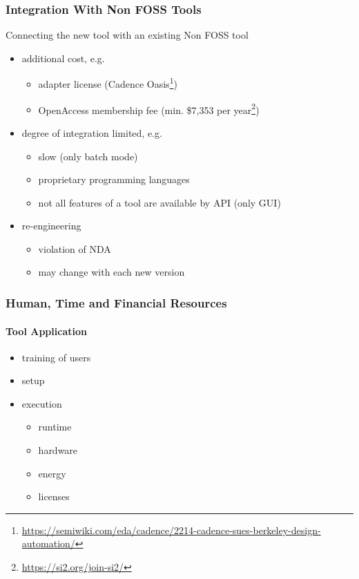 \documentclass[10pt, aspectratio=169]{beamer}
\begin{document}
\begin{frame}
\frametitle{Integration With Non FOSS Tools}

Connecting the new tool with an existing Non FOSS tool

\vspace{5mm}

\begin{itemize}
  \item additional cost, e.g.
    \begin{itemize}
      \item adapter license (Cadence Oasis\footnote{\url{https://semiwiki.com/eda/cadence/2214-cadence-sues-berkeley-design-automation/}})
      \item OpenAccess membership fee (min. \$7,353 per year\footnote{\url{https://si2.org/join-si2/}})
    \end{itemize}  
  \item degree of integration limited, e.g.
    \begin{itemize}
      \item slow (only batch mode)
      \item proprietary programming languages
      \item not all features of a tool are available by API (only GUI)
    \end{itemize}
  \item re-engineering
    \begin{itemize}
      \item violation of NDA
      \item may change with each new version
    \end{itemize}
\end{itemize}
\end{frame}

\begin{frame}
\frametitle{Human, Time and Financial Resources}
\framesubtitle{Tool Application}

\begin{itemize}
  \item training of users
  \item setup 
  \item execution
  \begin{itemize}
    \item runtime
    \item hardware
    \item energy
    \item licenses
  \end{itemize}
\end{itemize}

\end{frame}
\end{document}
